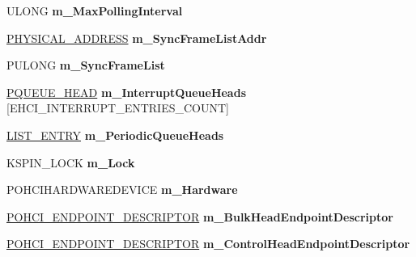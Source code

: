 \begin{DoxyCompactItemize}
U\+L\+O\+NG {\bfseries m\+\_\+\+Max\+Polling\+Interval}
\item 
\mbox{\label{class_c_u_s_b_queue_a3f781c208eb2515e43f21ed2dc7ada65}} 
\hyperlink{union___l_a_r_g_e___i_n_t_e_g_e_r}{P\+H\+Y\+S\+I\+C\+A\+L\+\_\+\+A\+D\+D\+R\+E\+SS} {\bfseries m\+\_\+\+Sync\+Frame\+List\+Addr}
\item 
\mbox{\label{class_c_u_s_b_queue_abfd2fd377e3c1ca2823251bba7a9bdbe}} 
P\+U\+L\+O\+NG {\bfseries m\+\_\+\+Sync\+Frame\+List}
\item 
\mbox{\label{class_c_u_s_b_queue_af29c73946031f910ff9dd96cac13536c}} 
\hyperlink{struct___q_u_e_u_e___h_e_a_d}{P\+Q\+U\+E\+U\+E\+\_\+\+H\+E\+AD} {\bfseries m\+\_\+\+Interrupt\+Queue\+Heads} \mbox{[}E\+H\+C\+I\+\_\+\+I\+N\+T\+E\+R\+R\+U\+P\+T\+\_\+\+E\+N\+T\+R\+I\+E\+S\+\_\+\+C\+O\+U\+NT\mbox{]}
\item 
\mbox{\label{class_c_u_s_b_queue_a7a842f49392b348d71d2a7506ff1400e}} 
\hyperlink{struct___l_i_s_t___e_n_t_r_y}{L\+I\+S\+T\+\_\+\+E\+N\+T\+RY} {\bfseries m\+\_\+\+Periodic\+Queue\+Heads}
\item 
\mbox{\label{class_c_u_s_b_queue_a06702ec769795ce186117304ff47054b}} 
K\+S\+P\+I\+N\+\_\+\+L\+O\+CK {\bfseries m\+\_\+\+Lock}
\item 
\mbox{\label{class_c_u_s_b_queue_ac9b41cb3be3dc9d8f1df2b4d295140b7}} 
P\+O\+H\+C\+I\+H\+A\+R\+D\+W\+A\+R\+E\+D\+E\+V\+I\+CE {\bfseries m\+\_\+\+Hardware}
\item 
\mbox{\label{class_c_u_s_b_queue_a465259bfbd98463c0df996eed820a347}} 
\hyperlink{struct___o_h_c_i___e_n_d_p_o_i_n_t___d_e_s_c_r_i_p_t_o_r}{P\+O\+H\+C\+I\+\_\+\+E\+N\+D\+P\+O\+I\+N\+T\+\_\+\+D\+E\+S\+C\+R\+I\+P\+T\+OR} {\bfseries m\+\_\+\+Bulk\+Head\+Endpoint\+Descriptor}
\item 
\mbox{\label{class_c_u_s_b_queue_a2184ad061491b27c4ad28e3b46727fbe}} 
\hyperlink{struct___o_h_c_i___e_n_d_p_o_i_n_t___d_e_s_c_r_i_p_t_o_r}{P\+O\+H\+C\+I\+\_\+\+E\+N\+D\+P\+O\+I\+N\+T\+\_\+\+D\+E\+S\+C\+R\+I\+P\+T\+OR} {\bfseries m\+\_\+\+Control\+Head\+Endpoint\+Descriptor}

\end{DoxyCompactItemize}
